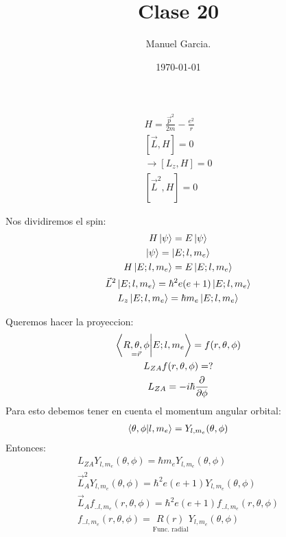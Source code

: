 \documentclass{article}
\title{Clase 20 }
\author{Manuel Garcia.}
\date{\today}
\begin{document}
\maketitle

\section{}
\begin{gather*}
  H =  \frac{\vec p ^2 }{2m } - \frac{e^2 }{r }\\
  [\vec L , H] = 0 \\
  \rightarrow [L_z, H] = 0 \\
  [\vec L^2 , H ] = 0 
\end{gather*}

Nos dividiremos el spin: 
\begin{gather*}
  H \ket{\psi} = E \ket{\psi} \\
  \ket{\psi} = \ket{E;l,m_e }\\
  H \ket{E;l,m_e } = E \ket{E;l,m_e }\\
  \vec L^2 \ket{E;l,m_e} = \hbar ^2 e(e+1)\ket{E;l,m_e }\\
  L_z \ket{E;l,m_e } = \hbar m_e \ket{E;l,m_e }
\end{gather*}

Queremos hacer la proyeccion: 
\begin{gather*}
  \bra{\underset{= \vec r }{R,\theta, \phi }}\ket{E;l,m_e } =  f(r,\theta,\phi)\\
  L _{ZA } f(r,\theta,\phi) = ?\\
  L _{ZA } = - i \hbar \frac{\partial  }{\partial \phi }
\end{gather*}
Para esto debemos tener en cuenta el momentum angular orbital: 
\begin{gather*}
  \bra{\theta,\phi }\ket{l,m_e } = Y _{l,m_e } (\theta,\phi )  
\end{gather*}
Entonces: 
\begin{gather*}
  L_{ZA}  Y _{l,m_e } (\theta,\phi ) = \hbar  m_e Y _{l,m_e } (\theta,\phi ) \\
  \vec L_A ^2Y _{l,m_e }(\theta,\phi) = \hbar ^2 e(e+1) Y _{l,m_e }(\theta,\phi)\\
  \vec L_A f _{..l,m_e } (r,\theta,\phi) = \hbar ^2 e(e+1) f _{..l,m_e } (r,\theta,\phi)\\
  f _{..l,m_e } (r,\theta,\phi) = \underset{\text{Func. radial}}{R(r)}Y _{l,m_e } (\theta, \phi )
\end{gather*}
\end{document}
